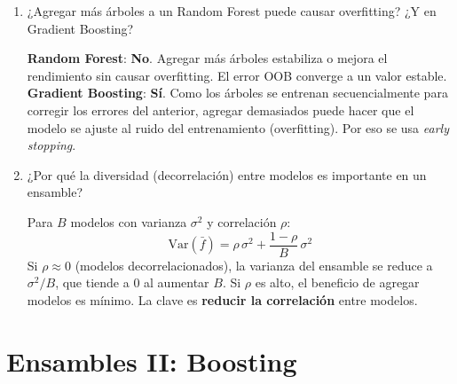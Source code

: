 \documentclass[11pt,a4paper]{article}
\begin{document}
\begin{enumerate}[label=\textbf{P\arabic*.}, resume]
\item ¿Agregar m\'as \'arboles a un Random Forest puede causar overfitting? ¿Y en
  Gradient Boosting?

\begin{answerbox}
\textbf{Random Forest}: \textbf{No}. Agregar m\'as \'arboles estabiliza o mejora el
rendimiento sin causar overfitting. El error OOB converge a un valor estable.\\[4pt]
\textbf{Gradient Boosting}: \textbf{S\'i}. Como los \'arboles se entrenan
secuencialmente para corregir los errores del anterior, agregar demasiados puede hacer
que el modelo se ajuste al ruido del entrenamiento (overfitting). Por eso se usa
\textit{early stopping}.
\end{answerbox}

\item ¿Por qu\'e la diversidad (decorrelaci\'on) entre modelos es importante en un
  ensamble?

\begin{answerbox}
Para $B$ modelos con varianza $\sigma^2$ y correlaci\'on $\rho$:
\[
  \text{Var}(\bar{f}) = \rho\,\sigma^2 + \frac{1-\rho}{B}\,\sigma^2
\]
Si $\rho \approx 0$ (modelos decorrelacionados), la varianza del ensamble se reduce a
$\sigma^2/B$, que tiende a 0 al aumentar $B$. Si $\rho$ es alto, el beneficio de
agregar modelos es m\'inimo. La clave es \textbf{reducir la correlaci\'on} entre
modelos.
\end{answerbox}

\end{enumerate}

\section{Ensambles II: Boosting}
\end{document}
